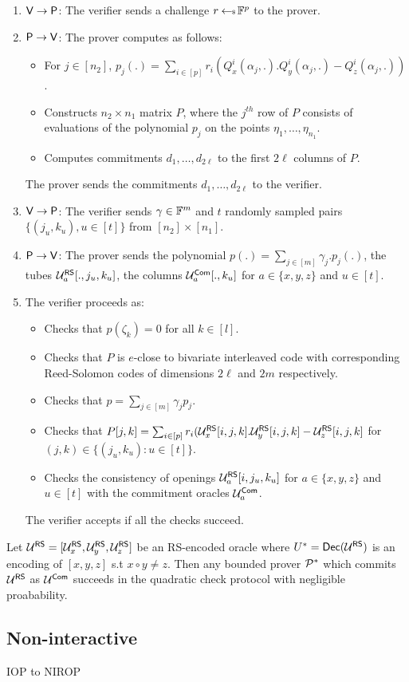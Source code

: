 \begin{enumerate}[{\rm 1.}]
\item $\mathsf{V}\rightarrow\mathsf{P}$: The verifier sends a challenge $r\hskip2.3pt{\gets\!\!\mbox{\tiny${\$}$\normalsize}}\,
\mathbb{F}^p$ to the prover.
\item $\mathsf{P}\rightarrow\mathsf{V}$: The prover computes as follows:
  \begin{itemize}
  \item For $j\in [n_2]$, $p_j(.)=\sum_{i\in [p]}
r_i(Q^i_x(\alpha_j,.).Q^i_y(\alpha_j,.)-Q^i_z(\alpha_j,.))$.
  \item Constructs $n_2\times n_1$ matrix $P$, where the $j^{th}$ row of $P$
consists of evaluations of the polynomial $p_j$ on the points
$\eta_1,\ldots,\eta_{n_1}$.
  \item Computes commitments $d_1,\ldots,d_{2\ell}$ to the first $2\ell$
columns of $P$.
  \end{itemize}
The prover sends the commitments $d_1,\ldots,d_{2\ell}$ to the verifier.

\item $\mathsf{V}\rightarrow\mathsf{P}$: The verifier sends $\gamma\in \mathbb{F}^m$ and
$t$ randomly sampled pairs $\{(j_u,k_u),u\in [t]\}$ from $[n_2]\times [n_1]$. 

\item $\mathsf{P}\rightarrow\mathsf{V}$: The prover sends the polynomial
$p(.)=\sum_{j\in [m]}\gamma_j.p_j(.)$, the tubes $\mathcal{U}^{\mathsf{RS}}_a[.,j_u,k_u]$,
 the columns $\mathcal{U}^{\mathsf{Com}}_a[.,k_u]$ for $a\in\{x,y,z\}$ and $u\in [t]$.

\item The verifier proceeds as:
  \begin{itemize}
  \item Checks that $p(\zeta_k)=0$ for all $k\in [l]$.
  \item Checks that $P$ is $e$-close to bivariate interleaved code with
corresponding Reed-Solomon codes of dimensions $2\ell$ and $2m$ respectively.
  \item Checks that $p=\sum_{j\in [m]}\gamma_jp_j$.
  \item Checks that $P[j,k]=\sum_{i\in
[p]}r_i(\mathcal{U}^{\mathsf{RS}}_x[i,j,k].\mathcal{U}^{\mathsf{RS}}_y[i,j,k]-\mathcal{U}^{\mathsf{RS}}_z[i,j,k]$ for $(j,k)\in
\{(j_u,k_u):u\in [t]\}$.
  \item Checks the consistency of openings $\mathcal{U}^{\mathsf{RS}}_a[i,j_u,k_u]$ for $a\in
\{x,y,z\}$ and $u\in [t]$ with the commitment oracles $\mathcal{U}^{\mathsf{Com}}_a$.
  \end{itemize}
The verifier accepts if all the checks succeed.

\end{enumerate}


\begin{lemma}\label{lem:quadhecksound}
Let $\mathcal{U}^{\mathsf{RS}} = [\mathcal{U}^{\mathsf{RS}}_x,\mathcal{U}^{\mathsf{RS}}_y,\mathcal{U}^{\mathsf{RS}}_z]$ be an RS-encoded oracle where $U^\ast=\mathsf{Dec}(\mathcal{U}^{\mathsf{RS}})$ is
an encoding of $[x,y,z]$ s.t $x\circ y\neq z$. Then any bounded prover $\mathcal{P}^\ast$ which
commits $\mathcal{U}^{\mathsf{RS}}$ as $\mathcal{U}^{\mathsf{Com}}$ succeeds in the quadratic check protocol with
negligible proabability.
\end{lemma}


\subsection{Non-interactive}
IOP to NIROP